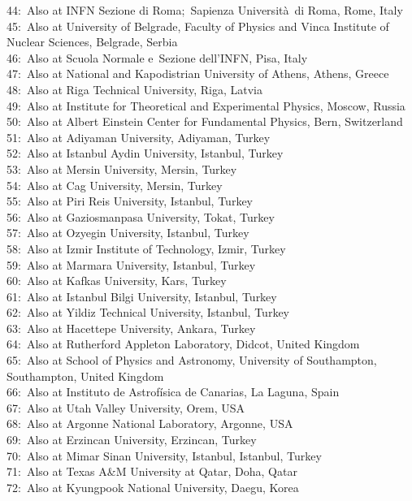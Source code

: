 $$44:~Also at INFN Sezione di Roma;~Sapienza Universit\`{a}~di Roma, Rome, Italy\\
45:~Also at University of Belgrade, Faculty of Physics and Vinca Institute of Nuclear Sciences, Belgrade, Serbia\\
46:~Also at Scuola Normale e~Sezione dell'INFN, Pisa, Italy\\
47:~Also at National and Kapodistrian University of Athens, Athens, Greece\\
48:~Also at Riga Technical University, Riga, Latvia\\
49:~Also at Institute for Theoretical and Experimental Physics, Moscow, Russia\\
50:~Also at Albert Einstein Center for Fundamental Physics, Bern, Switzerland\\
51:~Also at Adiyaman University, Adiyaman, Turkey\\
52:~Also at Istanbul Aydin University, Istanbul, Turkey\\
53:~Also at Mersin University, Mersin, Turkey\\
54:~Also at Cag University, Mersin, Turkey\\
55:~Also at Piri Reis University, Istanbul, Turkey\\
56:~Also at Gaziosmanpasa University, Tokat, Turkey\\
57:~Also at Ozyegin University, Istanbul, Turkey\\
58:~Also at Izmir Institute of Technology, Izmir, Turkey\\
59:~Also at Marmara University, Istanbul, Turkey\\
60:~Also at Kafkas University, Kars, Turkey\\
61:~Also at Istanbul Bilgi University, Istanbul, Turkey\\
62:~Also at Yildiz Technical University, Istanbul, Turkey\\
63:~Also at Hacettepe University, Ankara, Turkey\\
64:~Also at Rutherford Appleton Laboratory, Didcot, United Kingdom\\
65:~Also at School of Physics and Astronomy, University of Southampton, Southampton, United Kingdom\\
66:~Also at Instituto de Astrof\'{i}sica de Canarias, La Laguna, Spain\\
67:~Also at Utah Valley University, Orem, USA\\
68:~Also at Argonne National Laboratory, Argonne, USA\\
69:~Also at Erzincan University, Erzincan, Turkey\\
70:~Also at Mimar Sinan University, Istanbul, Istanbul, Turkey\\
71:~Also at Texas A\&M University at Qatar, Doha, Qatar\\
72:~Also at Kyungpook National University, Daegu, Korea\\

